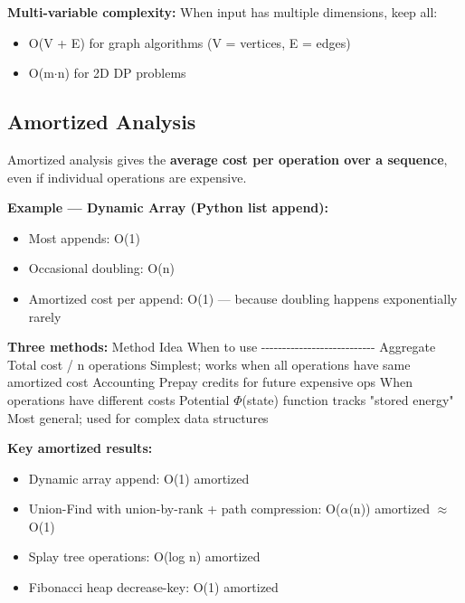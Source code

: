 \documentclass[11pt]{article}
\providecommand{\tightlist}{\setlength{\itemsep}{1pt}\setlength{\parskip}{0pt}}
\begin{document}
\textbf{Multi-variable complexity:} When input has multiple dimensions, keep all:

\begin{itemize}
\tightlist
\item
  O(V + E) for graph algorithms (V = vertices, E = edges)
\item
  O(m\(\cdot\)n) for 2D DP problems
\end{itemize}

\subsection{Amortized Analysis}\label{amortized-analysis}

Amortized analysis gives the \textbf{average cost per operation over a sequence}, even if individual operations are expensive.

\textbf{Example --- Dynamic Array (Python list append):}

\begin{itemize}
\tightlist
\item
  Most appends: O(1)
\item
  Occasional doubling: O(n)
\item
  Amortized cost per append: O(1) --- because doubling happens exponentially rarely
\end{itemize}

\textbf{Three methods:}
\textbar{} Method \textbar{} Idea \textbar{} When to use \textbar{}
\textbar-\/-\/-\/-\/-\/-\/-\/-\textbar-\/-\/-\/-\/-\/-\textbar-\/-\/-\/-\/-\/-\/-\/-\/-\/-\/-\/-\/-\textbar{}
\textbar{} Aggregate \textbar{} Total cost / n operations \textbar{} Simplest; works when all operations have same amortized cost \textbar{}
\textbar{} Accounting \textbar{} Prepay credits for future expensive ops \textbar{} When operations have different costs \textbar{}
\textbar{} Potential \textbar{} \(\Phi\)(state) function tracks "stored energy" \textbar{} Most general; used for complex data structures \textbar{}

\textbf{Key amortized results:}

\begin{itemize}
\tightlist
\item
  Dynamic array append: O(1) amortized
\item
  Union-Find with union-by-rank + path compression: O(\(\alpha\)(n)) amortized \(\approx\) O(1)
\item
  Splay tree operations: O(log n) amortized
\item
  Fibonacci heap decrease-key: O(1) amortized
\end{itemize}
\end{document}

